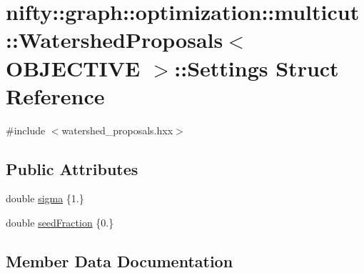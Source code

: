 \hypertarget{structnifty_1_1graph_1_1optimization_1_1multicut_1_1WatershedProposals_1_1Settings}{}\section{nifty\+:\+:graph\+:\+:optimization\+:\+:multicut\+:\+:Watershed\+Proposals$<$ O\+B\+J\+E\+C\+T\+I\+V\+E $>$\+:\+:Settings Struct Reference}
\label{structnifty_1_1graph_1_1optimization_1_1multicut_1_1WatershedProposals_1_1Settings}


{\ttfamily \#include $<$watershed\+\_\+proposals.\+hxx$>$}

\subsection*{Public Attributes}
\begin{DoxyCompactItemize}
\item 
double \hyperlink{structnifty_1_1graph_1_1optimization_1_1multicut_1_1WatershedProposals_1_1Settings_af12c49798d57f8d825fccd28b8fe1deb}{sigma} \{1.\}
\item 
double \hyperlink{structnifty_1_1graph_1_1optimization_1_1multicut_1_1WatershedProposals_1_1Settings_a9b4f54691c04ebb732815734b75fcd3c}{seed\+Fraction} \{0.\}
\end{DoxyCompactItemize}


\subsection{Member Data Documentation}
\hypertarget{structnifty_1_1graph_1_1optimization_1_1multicut_1_1WatershedProposals_1_1Settings_a9b4f54691c04ebb732815734b75fcd3c}{}
